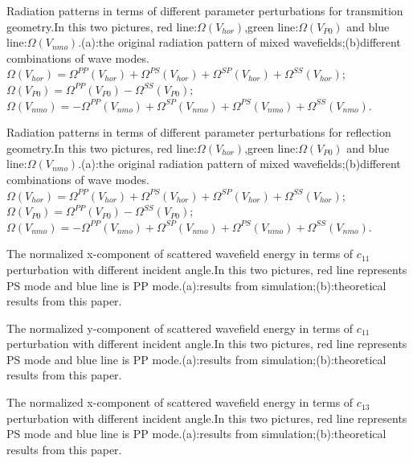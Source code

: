 {Radiation patterns in terms of different parameter perturbations for transmition
	geometry.In this two pictures, red line:$\Omega (V_{hor})$,green line:$\Omega
	(V_{P0})$ and blue line:$\Omega (V_{nmo})$.(a):the original radiation pattern of
	mixed wavefields;(b)different combinations of wave modes.$\Omega (V_{hor})=
  \Omega^{PP}(V_{hor})+\Omega^{PS}(V_{hor})+\Omega^{SP}(V_{hor})+\Omega^{SS}(V_{hor})$;
  $\Omega (V_{P0})=\Omega^{PP}(V_{P0})-\Omega^{SS}(V_{P0})$;
  $\Omega (V_{nmo})=-\Omega^{PP}(V_{nmo})+\Omega^{SP}(V_{nmo})+\Omega^{PS}(V_{nmo})+
  \Omega^{SS}(V_{nmo})$.}

{Radiation patterns in terms of different parameter perturbations for reflection
	geometry.In this two pictures, red line:$\Omega (V_{hor})$,green line:$\Omega
	(V_{P0})$ and blue line:$\Omega (V_{nmo})$.(a):the original radiation pattern of
	mixed wavefields;(b)different combinations of wave modes.$\Omega (V_{hor})=
  \Omega^{PP}(V_{hor})+\Omega^{PS}(V_{hor})+\Omega^{SP}(V_{hor})+\Omega^{SS}(V_{hor})$;
  $\Omega (V_{P0})=\Omega^{PP}(V_{P0})-\Omega^{SS}(V_{P0})$;
  $\Omega (V_{nmo})=-\Omega^{PP}(V_{nmo})+\Omega^{SP}(V_{nmo})+\Omega^{PS}(V_{nmo})+
  \Omega^{SS}(V_{nmo})$.}

{The normalized x-component of scattered wavefield energy in terms of $c_{11}$ perturbation with
different incident angle.In this two pictures, red line represents PS mode and blue line is PP
	mode.(a):results from simulation;(b):theoretical results from this paper.
	}

{The normalized y-component of scattered wavefield energy in terms of $c_{11}$ perturbation with
different incident angle.In this two pictures, red line represents PS mode and blue line is PP
	mode.(a):results from simulation;(b):theoretical results from this paper.
	}

{The normalized x-component of scattered wavefield energy in terms of $c_{13}$ perturbation with
different incident angle.In this two pictures, red line represents PS mode and blue line is PP
	mode.(a):results from simulation;(b):theoretical results from this paper.
	}

